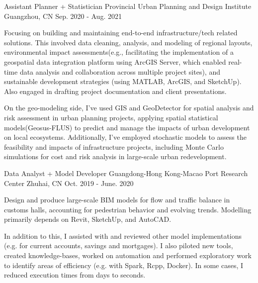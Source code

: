 

\begin{cventries}

  \cventry
    {Assistant Planner + Statistician} %
    {Provincial Urban Planning and Design Institute} %
    {Guangzhou, CN} %
    {Sep. 2020 - Aug. 2021} %
    {
      \begin{cvitems} %
        \item {Focusing on building and maintaining end-to-end infrastructure/tech related solutions. This involved data cleaning, analysis, and modeling of regional layouts, environmental impact assessments(e.g., facilitating the implementation of a geospatial data integration platform using ArcGIS Server, which enabled real-time data analysis and collaboration across multiple project sites), and sustainable development strategies (using MATLAB, ArcGIS, and SketchUp). Also engaged in drafting project documentation and client presentations.}
        \item {On the geo-modeling side, I've used GIS and GeoDetector for spatial analysis and risk assessment in urban planning projects, applying spatial statistical models(Geosus-FLUS) to predict and manage the impacts of urban development on local ecosystems. Additionally, I've employed stochastic models to assess the feasibility and impacts of infrastructure projects, including Monte Carlo simulations for cost and risk analysis in large-scale urban redevelopment. }
      \end{cvitems}
    }

  \cventry
    {Data Analyst + Model Developer} %
    {Guangdong-Hong Kong-Macao Port Research Center} %
    {Zhuhai, CN} %
    {Oct. 2019 - June. 2020} %
    {
      \begin{cvitems} %
        \item {Design and produce large-scale BIM models for flow and traffic balance in customs halls, accounting for pedestrian behavior and evolving trends. Modelling primarily depends on Revit, SketchUp, and AutoCAD.}
        \item {In addition to this, I assisted with and reviewed other model implementations (e.g. for current accounts, savings and mortgages). I also piloted new tools, created knowledge-bases, worked on automation and performed exploratory work to identify areas of efficiency (e.g. with Spark, Rcpp, Docker). In some cases, I reduced execution times from days to seconds.}
      \end{cvitems}
    }

\end{cventries}
